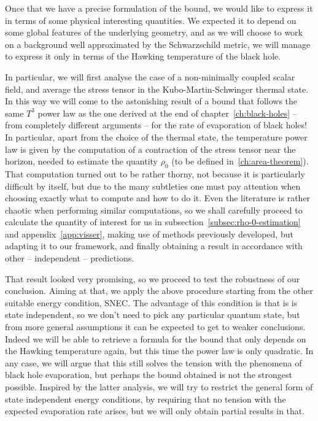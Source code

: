 Once that we have a precise formulation of the bound, we would like to express it in terms of some physical interesting quantities. We expected it to depend on some global features of the underlying geometry, and as we will choose to work on a background well approximated by the Schwarzschild metric, we will manage to express it only in terms of the Hawking temperature of the black hole.  

In particular, we will first analyse the case of a non-minimally coupled scalar field, and average the stress tensor in the Kubo-Martin-Schwinger thermal state. In this way we will come to the astonishing result of a bound that follows the same \(T^3\) power law as the one derived at the end of chapter~\ref{ch:black-holes} -- from completely different arguments -- for the rate of evaporation of black holes!
In particular, apart from the choice of the thermal state, the temperature power law is given by the computation of a contraction of the stress tensor near the horizon, needed to estimate the quantity \(\rho_0\) (to be defined in~\ref{ch:area-theorem}). That computation turned out to be rather thorny, not because it is particularly difficult by itself, but due to the many subtleties one must pay attention when choosing exactly what to compute and how to do it. Even the literature is rather chaotic when performing similar computations, so we shall carefully proceed to calculate the quantity of interest for us in subsection~\ref{subsec:rho-0-estimation} and appendix~\ref{app:visser}, making use of methods previously developed, but adapting it to our framework, and finally obtaining a result in accordance with other -- independent -- predictions. 

That result looked very promising, so we proceed to test the robustness of our conclusion. Aiming at that, we apply the above procedure starting from the other suitable energy condition, SNEC. The advantage of this condition is that is is state independent, so we don't need to pick any particular quantum state, but from more general assumptions it can be expected to get to weaker conclusions. Indeed we will be able to retrieve a formula for the bound that only depends on the Hawking temperature again, but this time the power law is only quadratic.
In any case, we will argue that this still solves the tension with the phenomena of black hole evaporation, but perhaps the bound obtained is not the strongest possible.
Inspired by the latter analysis, we will try to restrict the general form of state independent energy conditions, by requiring that no tension with the expected evaporation rate arises, but we will only obtain partial results in that.

